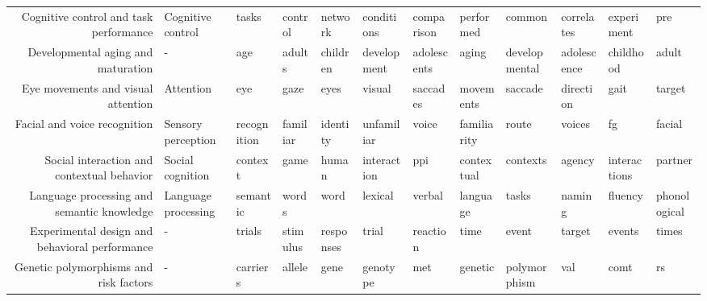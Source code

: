 \documentclass[english]{article}
\begin{document}
\begin{landscape}
  \tabletail{\bottomrule}
  \tiny

\begin{supertabular}{rlllllllllll}
  Cognitive control and task performance &   Cognitive control &            tasks &       control &         network &     conditions &  comparison &      performed &        common &     correlates &    experiment &            pre \\
  Developmental aging and maturation &                   - &              age &        adults &        children &    development & adolescents &          aging & developmental &    adolescence &     childhood &          adult \\
  Eye movements and visual attention &           Attention &              eye &          gaze &            eyes &         visual &    saccades &      movements &       saccade &      direction &          gait &         target \\
        Facial and voice recognition &  Sensory perception &      recognition &      familiar &        identity &     unfamiliar &       voice &    familiarity &         route &         voices &            fg &         facial \\
Social interaction and contextual behavior &    Social cognition &          context &          game &           human &    interaction &         ppi &     contextual &      contexts &         agency &  interactions &        partner \\
Language processing and semantic knowledge & Language processing &         semantic &         words &            word &        lexical &      verbal &       language &         tasks &         naming &       fluency &   phonological \\
Experimental design and behavioral performance &                   - &           trials &      stimulus &       responses &          trial &    reaction &           time &         event &         target &        events &          times \\
Genetic polymorphisms and risk factors &                   - &         carriers &        allele &            gene &       genotype &         met &        genetic &  polymorphism &            val &          comt &             rs \\

\end{supertabular}
\end{landscape}
\end{document}
